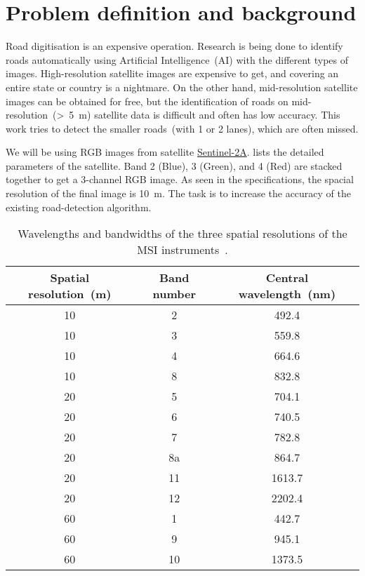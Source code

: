 \chapter{Problem definition and background}\label{chapt:problem}
Road digitisation is an expensive operation. Research is being done to identify roads automatically using Artificial Intelligence~(AI) with the different types of images. High-resolution satellite images are expensive to get, and covering an entire state or country is a nightmare. On the other hand, mid-resolution satellite images can be obtained for free, but the identification of roads on mid-resolution~(>~5~m) satellite data is difficult and often has low accuracy. This work tries to detect the smaller roads~(with 1 or 2 lanes), which are often missed.

We will be using RGB images from satellite \href{https://sentinel.esa.int/web/sentinel/missions/sentinel-2}{Sentinel-2A}.  lists the detailed parameters of the satellite. Band 2 (Blue), 3 (Green), and 4 (Red) are stacked together to get a 3-channel RGB image. As seen in the specifications, the spacial resolution of the final image is 10~m. The task is to increase the accuracy of the existing road-detection algorithm.

\begin{table}[h!]
  \centering
  \begin{tabular}{ |c|c|c| }
    \hline
    Spatial resolution~(m) & Band number & Central wavelength~(nm) \\
    \hline
    10&2&492.4 \\
    10&3&559.8 \\
    10&4&664.6 \\
    10&8&832.8 \\
    20&5&704.1 \\
    20&6&740.5 \\
    20&7&782.8 \\
    20&8a&864.7 \\
    20&11&1613.7 \\
    20&12&2202.4 \\
    60&1&442.7 \\
    60&9&945.1 \\
    60&10&1373.5 \\
    \hline
  \end{tabular}
  \caption[Wavelengths and bandwidths of the three spatial resolutions of the MSI instruments]{Wavelengths and bandwidths of the three spatial resolutions of the MSI instruments~\cite{sentinelSpecifications}.}
  \label{tab:sentinel-resolution}
\end{table}

